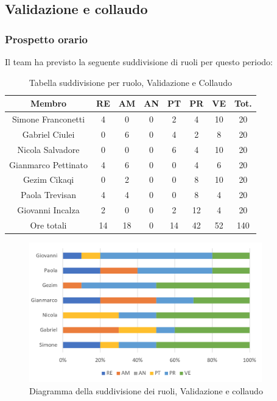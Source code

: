 \subsection{Validazione e collaudo}
\subsubsection{Prospetto orario}
Il team ha previsto la seguente suddivisione di ruoli per questo periodo:
\begin{table}[h]
\caption{Tabella suddivisione per ruolo, Validazione e Collaudo}
\begin{center}
\begin{tabular}{ |c|c|c|c|c|c|c|c|  }
 \hline
 Membro 		& RE 	& AM 	& AN 	& PT 	& PR 	& VE 	& Tot.\\
 \hline\hline
 Simone Franconetti			& 4 		& 0		& 0 	& 2 		& 4 		& 10 		& 20\\
 Gabriel Ciulei		& 0 		& 6 		& 0 	& 4		& 2 		& 8 		& 20\\
 Nicola	Salvadore		& 0 		& 0 		& 0 	& 6 		& 4 		& 10 		& 20\\
 Gianmarco Pettinato		& 4 		& 6 		& 0 	& 0	 	& 4 		& 6 		& 20\\
 Gezim Cikaqi			& 0 		& 2 		& 0 	& 0 		& 8 		& 10	 	& 20\\
 Paola Trevisan			& 4 		& 4 		& 0 	& 0 		& 8 		& 4 		& 20\\
 Giovanni Incalza		& 2 		& 0	 	& 0 	& 2 		& 12 	& 4  	& 20\\
 \hline\hline
 Ore totali		& 14		& 18		& 0 	& 14	 	& 42 	& 52 	& 140\\
  \hline
\end{tabular}
\end{center}
\end{table}
\begin{figure}[h!]
	\centering
	\includegraphics[width=0.9\textwidth]{res/img/hi5}
	\caption{Diagramma della suddivisione dei ruoli, Validazione e collaudo}
\end{figure}

